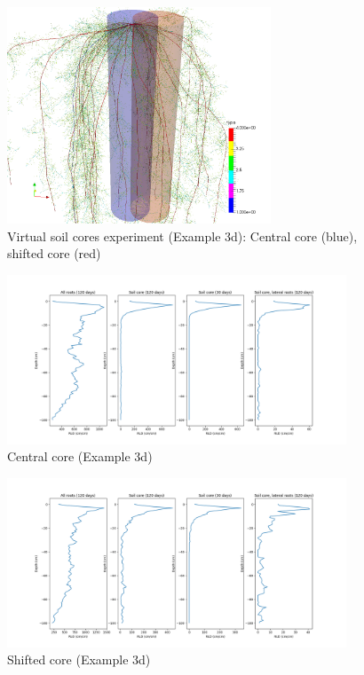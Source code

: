 \documentclass[a4paper]{article}
\begin{document}
\begin{figure}
\centering
\includegraphics[width=0.7\textwidth]{example_3d.png} %
\caption{Virtual soil cores experiment (Example 3d): Central core (blue), shifted core (red)} \label{fig:soilcoreGeom}
\end{figure} 

\begin{figure}
\centering
\includegraphics[width=0.9\textwidth]{example_3d1.png} 
\caption{Central core (Example 3d)} \label{fig:central}
\end{figure}

\begin{figure}
\centering
\includegraphics[width=0.9\textwidth]{example_3d2.png} 
\caption{Shifted core (Example 3d)} \label{fig:shifted}
\end{figure}
\end{document}
